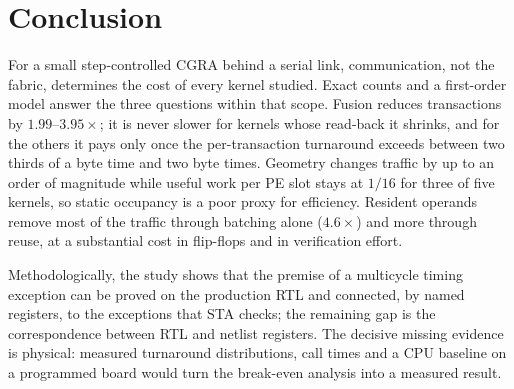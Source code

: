\section{Conclusion}
\label{sec:conclusion}

For a small step-controlled CGRA behind a serial link, communication, not
the fabric, determines the cost of every kernel studied. Exact counts and a
first-order model answer the three questions within that scope. Fusion
reduces transactions by $1.99$--$3.95\times$; it is never slower for kernels
whose read-back it shrinks, and for the others it pays only once the
per-transaction turnaround exceeds between two thirds of a byte time and two
byte times. Geometry
changes traffic by up to an order of magnitude while useful work per PE slot
stays at $1/16$ for three of five kernels, so static occupancy is a poor
proxy for efficiency. Resident operands remove most of the traffic through
batching alone ($4.6\times$) and more through reuse, at a substantial cost
in flip-flops and in verification effort.

Methodologically, the study shows that the premise of a multicycle timing
exception can be proved on the production RTL and connected, by named
registers, to the exceptions that STA checks; the remaining gap is the
correspondence between RTL and netlist registers. The decisive missing
evidence is physical: measured turnaround distributions, call times and a
CPU baseline on a programmed board would turn the break-even analysis into
a measured result.

